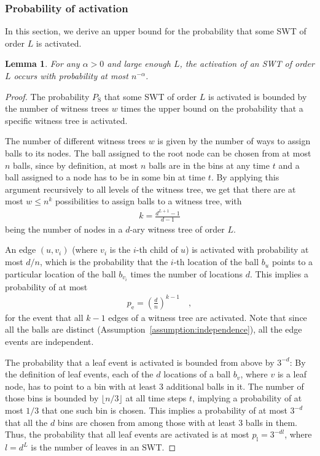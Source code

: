 \documentclass[a4paper,12pt]{article}
\newtheorem{lemma}{Lemma}
\begin{document}
\subsubsection{Probability of activation}
\label{sec:analysis:probabilitySymWT}
In this section, we derive an upper bound for the probability that some SWT of order $L$ is activated. 

\begin{lemma}\label{lemma:swt:activation}
For any $\alpha>0$ and large enough $L$, the activation of an SWT of order $L$ occurs with probability at most $n^{-\alpha}$.
\end{lemma}
\begin{proof}
The probability $P_\mathrm{S}$ that some SWT of order $L$ is activated is bounded by the number of witness trees $w$ times the upper bound on the probability that a specific witness tree is activated.

The number of different witness trees $w$ is given by the number of ways to assign balls to its nodes. The ball assigned to the root node can be chosen from at most $n$ balls, since by definition, at most $n$ balls are in the bins at any time $t$ and a ball assigned to a node has to be in some bin at time $t$. By applying this argument recursively to all levels of the witness tree, we get that there are at most $w \leq n^k$ possibilities to assign balls to a witness tree, with 
\begin{align*}
k = \frac{d^{L+1}-1}{d-1}
\end{align*}
being the number of nodes in a $d$-ary witness tree of order $L$.
 
An edge $(u, v_i)$ (where $v_i$ is the $i$-th child of $u$) is activated with probability at most $d/n$, which is the probability that the $i$-th location of the ball $b_u$ points to a particular location of the ball $b_{v_i}$ times the number of locations $d$. This implies a probability of at most
\begin{align*}
p_\mathrm{e} = \left(\frac{d}{n}\right)^{k-1} \quad ,
\end{align*} 
for the event that all $k-1$ edges of a witness tree are activated. Note that since all the balls are distinct (Assumption~\ref{assumption:independence}), all the edge events are independent.

The probability that a leaf event is activated is bounded from above by $3^{-d}$: By the definition of leaf events, each of the $d$ locations of a ball $b_v$, where $v$ is a leaf node, has to point to a bin with at least 3 additional balls in it. The number of those bins is bounded by $\lfloor n/3 \rfloor$ at all time steps $t$, implying a probability of at most $1/3$ that one such bin is chosen. This implies a probability of at most $3^{-d}$ that all the $d$ bins are chosen from among those with at least 3 balls in them. Thus, the probability that all leaf events are activated is at most $p_\mathrm{l} = 3^{-d l}$, where $l = d^{L}$ is the number of leaves in an SWT.


\end{proof}
\end{document}
